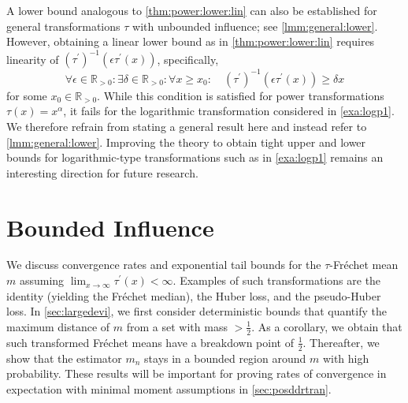 \documentclass{article}
\newcommand{\R}{\mathbb{R}}
\newcommand{\Rpp}{\R_{>0}}
\newcommand{\pr}{^\prime}
\newcommand{\tran}{\tau}
\newcommand{\dtran}{\tau\pr}
\newcommand{\invdtran}{(\tau\pr)^{-1}}
\begin{document}
\begin{remark}
    A lower bound analogous to \cref{thm:power:lower:lin} can also be established for general transformations $\tran$ with unbounded influence; see \cref{lmm:general:lower}. However, obtaining a linear lower bound as in \cref{thm:power:lower:lin} requires linearity of $\invdtran(\epsilon \dtran(x))$, specifically,
    \begin{equation}
      \forall \epsilon\in\Rpp \colon \exists \delta\in\Rpp \colon \forall x\geq x_0 \colon \quad \invdtran(\epsilon \dtran(x)) \geq \delta x
    \end{equation}
    for some $x_0\in\Rpp$. While this condition is satisfied for power transformations $\tran(x)=x^\alpha$, it fails for the logarithmic transformation considered in \cref{exa:logp1}. We therefore refrain from stating a general result here and instead refer to \cref{lmm:general:lower}. Improving the theory to obtain tight upper and lower bounds for logarithmic-type transformations such as in \cref{exa:logp1} remains an interesting direction for future research.
\end{remark}

\section{Bounded Influence}\label{sec:bounded}
%
We discuss convergence rates and exponential tail bounds for the $\tran$-Fr\'echet mean $m$ assuming $\lim_{x\to\infty}\dtran(x) < \infty$. Examples of such transformations are the identity (yielding the Fr\'echet median), the Huber loss, and the pseudo-Huber loss. In \cref{sec:largedevi}, we first consider deterministic bounds that quantify the maximum distance of $m$ from a set with mass $>\frac12$. As a corollary, we obtain that such transformed Fr\'echet means have a breakdown point of $\frac12$. Thereafter, we show that the estimator $m_n$ stays in a bounded region around $m$ with high probability. These results will be important for proving rates of convergence in expectation with minimal moment assumptions in \cref{sec:posddrtran}.
%
%
%
\end{document}
